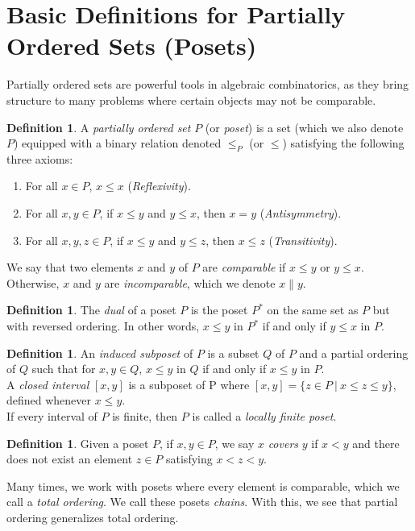 \documentclass[psamsfonts]{amsart}
\theoremstyle{definition}
\newtheorem{defn}[thm]{Definition}
\theoremstyle{remark}
\numberwithin{equation}{section}
\begin{document}
\section{Basic Definitions for Partially Ordered Sets (Posets)}  
Partially ordered sets are powerful tools in algebraic combinatorics, as they bring structure to many problems where certain objects may not be comparable. 
\begin{defn}  
A \textit{partially ordered set} $P$ (or \textit{poset}) is a set (which we also denote $P$) equipped with a binary relation denoted $\leq_P$ (or $\leq$) satisfying the following three axioms:
\begin{enumerate}
    \item For all $x\in P$, $x \leq x$ (\textit{Reflexivity}).
    \item For all $x, y\in P$, if $x \leq y$ and $y\leq x$, then $x = y$ (\textit{Antisymmetry}).
    \item For all $x, y, z\in P$, if $x\leq y$ and $y\leq z$, then $x\leq z$ (\textit{Transitivity}).
\end{enumerate}
We say that two elements $x$ and $y$ of $P$ are \textit{comparable} if $x\leq y$ or $y\leq x$. Otherwise, $x$ and $y$ are \textit{incomparable}, which we denote $x\| y$.
\end{defn}

\begin{defn}
The \textit{dual} of a poset $P$ is the poset $P^*$ on the same set as $P$ but with reversed ordering. In other words, $x\leq y$ in $P^*$ if and only if $y\leq x$ in $P$. 
\end{defn}

\begin{defn}
An \textit{induced subposet} of $P$ is a subset $Q$ of $P$ and a partial ordering of $Q$ such that for $x,y\in Q$, $x\leq y$ in $Q$ if and only if $x\leq y$ in $P$.\\
A \textit{closed interval} $[x,y]$ is a subposet of P where $[x,y] = \{ z\in P \ | \ x\leq z \leq y\}$, defined whenever $x\leq y$.\\
If every interval of $P$ is finite, then $P$ is called a \textit{locally finite poset}.
\end{defn}
\begin{defn}
Given a poset $P$, if $x,y\in P$, we say $x$ \textit{covers} $y$ if $x<y$ and there does not exist an element $z\in P$ satisfying $x<z<y$.
\end{defn}

Many times, we work with posets where every element is comparable, which we call a \textit{total ordering}. We call these posets \textit{chains}. With this, we see that partial ordering generalizes total ordering.
\end{document}
